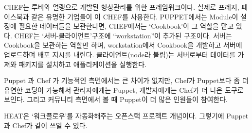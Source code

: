 \documentclass[11pt, a4paper]{article}
\begin{document}
CHEF는 루비와 얼랭으로 개발된 형상관리를 위한 프레임워크이다. 
실제로 프레지, 페이스북과 같은 유명한 기업들이 이 CHEF를 사용한다. 
PUPPET에서는 Module이 설정에 필요한 데이터들을 보관한다면, CHEF에서는 ‘Cookbook’이 그 역할을 맡고 있다. 
CHEF는 ‘서버-클라이언트’구조에 “workstation”이 추가된 구조이다. 
서버는 Cookbook을 보관하는 역할만 하며, workstation에서 Cookbook을 개발하고 서버에 업로드하며 배포 지시를 내린다.  
클라이언트(node라 불림)는 서버로부터 데이터를 가져와 패키지를 설치하고 애플리케이션을 실행한다. 

Puppet 과 Chef 가 기능적인 측면에서는 큰 차이가 없지만,  Chef가 Puppet보다 좀 더 유연한 코딩이 가능해서 관리자에게는 Puppet, 개발자에게는 Chef가 더 나은 도구로 보인다. 
그리고 커뮤니티 측면에서 볼 때 Puppet이 더 많은 인원들이 참여한다.

HEAT은 ‘워크플로우’를 자동화해주는 오픈스택 프로젝트 개념이다. 
그렇기에 Puppet과 Chef가 같이 쓰일 수 있다. 
\end{document}
